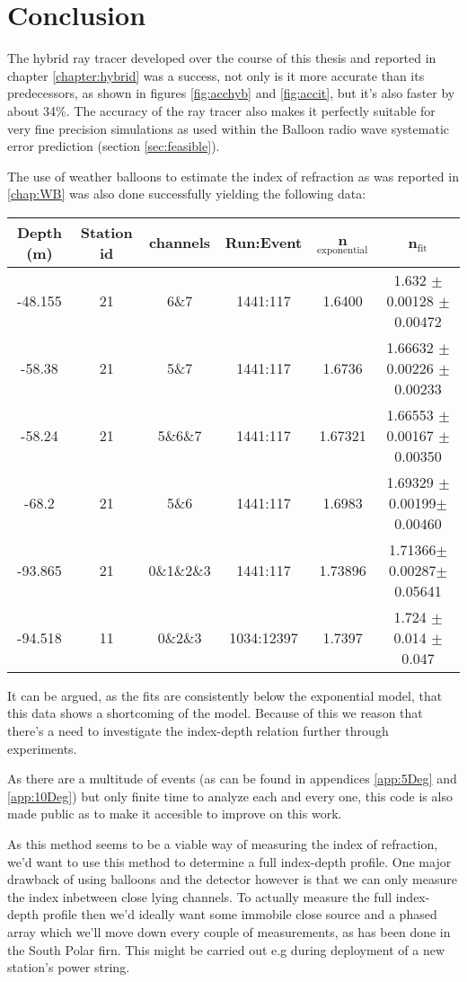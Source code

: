\chapter*{Conclusion}
The hybrid ray tracer developed over the course of this thesis and reported in
chapter \ref{chapter:hybrid} was a success, not only is it more accurate than
its predecessors, as shown in figures \ref{fig:acchyb} and \ref{fig:accit},
 but it's also faster by about 34\%.  The accuracy of the ray tracer also
makes it perfectly suitable for very fine precision simulations as used within
the Balloon radio wave systematic error prediction (section \ref{sec:feasible}).

The use of weather balloons to estimate the index of refraction as
was reported in \ref{chap:WB} was also done successfully 
yielding the following data:
\begin{center}
\begin{tabular}{||c c c c c c||}
 \hline
 Depth (m) & Station id & channels & Run:Event & n$_\text{exponential}$ & n$_\text{fit}$\\ [0.5ex]
 \hline\hline
 -48.155 & 21 & 6\&7 & 1441:117 & 1.6400 & 1.632 $\pm$ 0.00128 $\pm$ 0.00472\\
 -58.38 & 21 & 5\&7 & 1441:117 & 1.6736 & 1.66632 $\pm$ 0.00226 $\pm$ 0.00233 \\
 -58.24 & 21 & 5\&6\&7 & 1441:117 & 1.67321 & 1.66553 $\pm$ 0.00167 $\pm$ 0.00350 \\
 -68.2 & 21 & 5\&6 & 1441:117 & 1.6983 & 1.69329 $\pm$0.00199$\pm$0.00460 \\
 -93.865 & 21 & 0\&1\&2\&3 & 1441:117 & 1.73896 & 1.71366$\pm$0.00287$\pm$0.05641\\
 -94.518 & 11 & 0\&2\&3 & 1034:12397 & 1.7397 & 1.724 $\pm$ 0.014 $\pm$ 0.047 \\
 \hline
\end{tabular}
\end{center}
It can be argued, as the fits are consistently below the exponential model,
that this data shows a shortcoming of the model.  Because of this we reason
that there's a need to investigate the index-depth relation further through 
experiments.

As there are a multitude of events (as can be found in appendices
\ref{app:5Deg} and \ref{app:10Deg}) but only finite time to analyze each and
every one, this code is also made public \cite{projects-mt} as to make
it accesible to improve on this work.  

As this method seems to be a viable way of measuring the index of refraction,
we'd want to use this method to determine a full index-depth profile. One major
drawback of using balloons and the detector however is that we can only measure
the index inbetween close lying channels.  To actually measure the full
index-depth profile then we'd ideally want some immobile close source and a
phased array which we'll move down every couple of measurements, as has been
done in the South Polar firn\cite{kravchenko_besson_meyers_2004}.  This might
be carried out e.g during deployment of a new station's power string.
